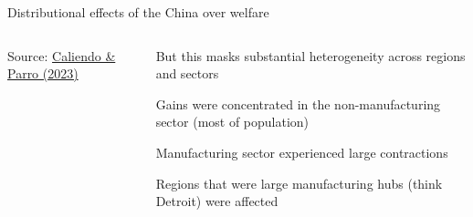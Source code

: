 \documentclass[notes,11pt, aspectratio=169, xcolor=table]{beamer}
\newenvironment{wideitemize}{\itemize\addtolength{\itemsep}{10pt}}{\enditemize}
\begin{document}
\begin{frame}{Distributional effects of the China over welfare}


\begin{columns}[T] %
\begin{column}{.65\textwidth}
\centering
    \vspace{12pt}
    { \scriptsize
    Source: \href{https://www.annualreviews.org/content/journals/10.1146/annurev-economics-082222-082019}{Caliendo \& Parro (2023)}
    }
\end{column}%
\hfill%
\begin{column}{.35\textwidth}
{\small
\begin{wideitemize}

    \item But this masks substantial heterogeneity across regions and sectors

    \item Gains were concentrated in the non-manufacturing sector (most of population)

    \item Manufacturing sector experienced large contractions

    \item Regions that were large manufacturing hubs (think Detroit) were affected
    
\end{wideitemize}
}
\end{column}%
\end{columns}

\end{frame}
\end{document}
